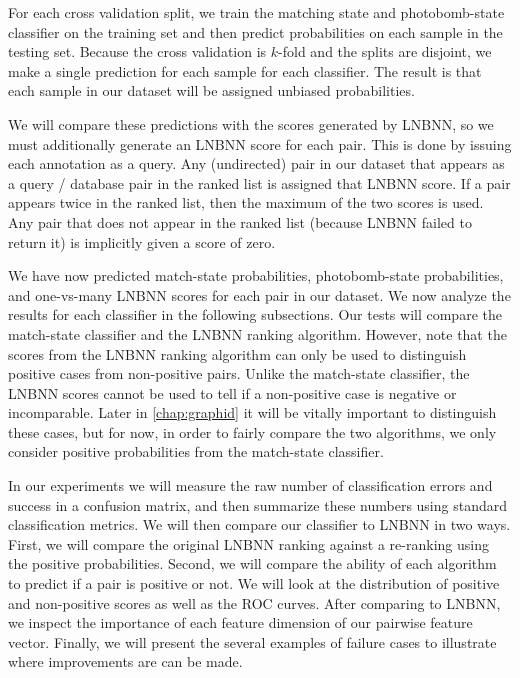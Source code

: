     For each cross validation split, we train the matching state and photobomb-state classifier on the training set
    and then predict probabilities on each sample in the testing set. Because the cross validation is $k$-fold and
    the splits are disjoint, we make a single prediction for each sample for each classifier. The result is that
    each sample in our dataset will be assigned unbiased probabilities.

    We will compare these predictions with the scores generated by LNBNN, so we must additionally generate an
      LNBNN score for each pair.
    This is done by issuing each annotation as a query.
    Any (undirected) pair in our dataset that appears as a query / database pair in the ranked list is assigned
      that LNBNN score.
    If a pair appears twice in the ranked list, then the maximum of the two scores is used.
    Any pair that does not appear in the ranked list (because LNBNN failed to return it) is implicitly given a
      score of zero.

    We have now predicted match-state probabilities, photobomb-state probabilities, and one-vs-many LNBNN scores
      for each pair in our dataset.
    We now analyze the results for each classifier in the following subsections.
    Our tests will compare the match-state classifier and the LNBNN ranking algorithm.
    However, note that the scores from the LNBNN ranking algorithm can only be used to distinguish positive cases
      from non-positive pairs.
    Unlike the match-state classifier, the LNBNN scores cannot be used to tell if a non-positive case is negative
      or incomparable.
    Later in \cref{chap:graphid} it will be vitally important to distinguish these cases, but for now, in order
      to fairly compare the two algorithms, we only consider positive probabilities from the match-state
      classifier.

    In our experiments we will measure the raw number of classification errors and success in a confusion matrix,
      and then summarize these numbers using standard classification metrics.
    We will then compare our classifier to LNBNN in two ways.
    First, we will compare the original LNBNN ranking against a re-ranking using the positive probabilities.
    Second, we will compare the ability of each algorithm to predict if a pair is positive or not.
    We will look at the distribution of positive and non-positive scores as well as the ROC curves.
    After comparing to LNBNN, we inspect the importance of each feature dimension of our pairwise feature vector.
    Finally, we will present the several examples of failure cases to illustrate where improvements are can be
      made.

